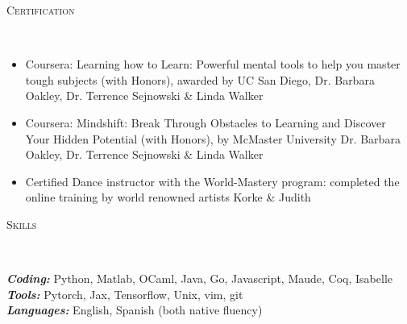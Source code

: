 \documentclass{article}
\newenvironment{changemargin}[2]{%
  \begin{list}{}{%
    \setlength{\topsep}{0pt}%
    \setlength{\leftmargin}{#1}%
    \setlength{\rightmargin}{#2}%
    \setlength{\listparindent}{\parindent}%
    \setlength{\itemindent}{\parindent}%
    \setlength{\parsep}{\parskip}%
  }%
  \item[]}{\end{list}
}
\newcommand{\lineover}{
	\begin{changemargin}{-0.05in}{-0.05in}
		\vspace*{-8pt}
		\hrulefill \\
		\vspace*{-2pt}
	\end{changemargin}
}
\newcommand{\header}[1]{
	\begin{changemargin}{-0.5in}{-0.5in}
		\scshape{#1}\\
  	\lineover
	\end{changemargin}
}
\newenvironment{body} {
	\vspace*{-16pt}
	\begin{changemargin}{-0.25in}{-0.5in}
  }	
	{\end{changemargin}
}
\begin{document}
\header{Certification}
\begin{body}
	\vspace{12pt}
	\begin{itemize} \itemsep -2pt  %
		\item Coursera: Learning how to Learn: Powerful mental tools to help you master tough subjects (with Honors), awarded by UC San Diego, Dr. Barbara Oakley, Dr. Terrence Sejnowski \& Linda Walker
	\end{itemize}
	\begin{itemize} \itemsep -2pt  %
		\item Coursera: Mindshift: Break Through Obstacles to Learning and Discover Your Hidden Potential (with Honors), by McMaster University Dr. Barbara Oakley, Dr. Terrence Sejnowski \& Linda Walker
	\end{itemize}
	\begin{itemize}
	    \item Certified Dance instructor with the World-Mastery program: completed the online training by world renowned artists Korke \& Judith
	\end{itemize}
\end{body}

\header{Skills}

\begin{body}
	\vspace{14pt}
	\emph{\textbf{Coding:}}{} Python, Matlab, OCaml, Java, Go, Javascript, Maude, Coq, Isabelle \\
	\smallskip
	\emph{\textbf{Tools:}}{}  Pytorch, Jax, Tensorflow, Unix, vim, git\\
	\smallskip
	\emph{\textbf{Languages:}}{} English, Spanish (both native fluency)\\
\end{body}
\smallskip
\end{document}
